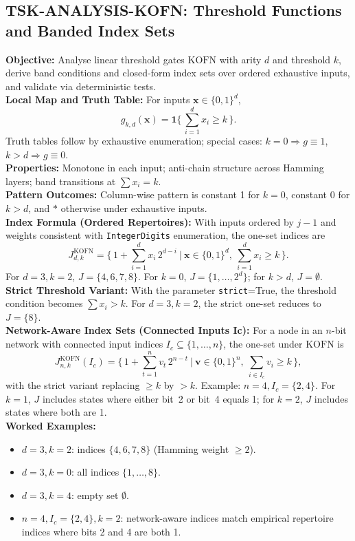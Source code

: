 \documentclass[11pt]{article}
\begin{document}
\subsection{TSK-ANALYSIS-KOFN: Threshold Functions and Banded Index Sets}
\textbf{Objective:} Analyse linear threshold gates \(\mathrm{KOFN}\) with arity \(d\) and threshold \(k\), derive band conditions and closed-form index sets over ordered exhaustive inputs, and validate via deterministic tests.\\
\textbf{Local Map and Truth Table:} For inputs \(\mathbf{x}\in\{0,1\}^d\),
\[
g_{k,d}(\mathbf{x}) = \mathbf{1}\{\,\sum_{i=1}^{d} x_i \ge k\,\}.
\]
Truth tables follow by exhaustive enumeration; special cases: \(k=0\Rightarrow g\equiv 1\), \(k>d\Rightarrow g\equiv 0\).\\
\textbf{Properties:} Monotone in each input; anti-chain structure across Hamming layers; band transitions at \(\sum x_i = k\).\\
\textbf{Pattern Outcomes:} Column-wise pattern is constant 1 for \(k=0\), constant 0 for \(k>d\), and \(*\) otherwise under exhaustive inputs.\\
\textbf{Index Formula (Ordered Repertoires):} With inputs ordered by \(j-1\) and weights consistent with \texttt{IntegerDigits} enumeration, the one-set indices are
\[
J^{\mathrm{KOFN}}_{d,k} = \Big\{\, 1 + \sum_{i=1}^{d} x_i\,2^{d-i} \ \Big| \ \mathbf{x}\in\{0,1\}^d,\ \sum_{i=1}^{d} x_i \ge k\,\Big\}.
\]
For \(d=3, k=2\), \(J=\{4,6,7,8\}\). For \(k=0\), \(J=\{1,\dots,2^d\}\); for \(k>d\), \(J=\emptyset\).\\
\textbf{Strict Threshold Variant:} With the parameter \texttt{strict}=True, the threshold condition becomes \(\sum x_i > k\). For \(d=3, k=2\), the strict one-set reduces to \(J=\{8\}\).\\
\textbf{Network-Aware Index Sets (Connected Inputs Ic):} For a node in an \(n\)-bit network with connected input indices \(I_c\subseteq\{1,\dots,n\}\), the one-set under \(\mathrm{KOFN}\) is
\[
J^{\mathrm{KOFN}}_{n,k}(I_c) = \Big\{\, 1 + \sum_{t=1}^{n} v_t\,2^{n-t} \ \Big| \ \mathbf{v}\in\{0,1\}^n,\ \sum_{i\in I_c} v_i \ge k\,\Big\},
\]
with the strict variant replacing \(\ge k\) by \(>k\). Example: \(n=4, I_c=\{2,4\}\). For \(k=1\), \(J\) includes states where either bit~2 or bit~4 equals 1; for \(k=2\), \(J\) includes states where both are 1.\\
\textbf{Worked Examples:}
\begin{itemize}
\item \(d=3, k=2\): indices \(\{4,6,7,8\}\) (Hamming weight \(\ge 2\)).
\item \(d=3, k=0\): all indices \(\{1,\dots,8\}\).
\item \(d=3, k=4\): empty set \(\emptyset\).
\item \(n=4, I_c=\{2,4\}, k=2\): network-aware indices match empirical repertoire indices where bits 2 and 4 are both 1.
\end{itemize}
\end{document}
